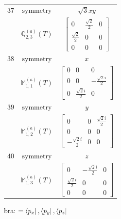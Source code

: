 \documentclass[fleqn,8pt,landscape]{jsarticle}
\begin{document}
\begin{longtable}{ccc}
$ 37 $ & $ \text{symmetry} $ & $ \sqrt{3} x y $ \\
$  $ & $ \mathbb{Q}_{2,3}^{(a)}(T) $ & $ \begin{bmatrix} 0 & \frac{\sqrt{2}}{2} & 0 \\ \frac{\sqrt{2}}{2} & 0 & 0 \\ 0 & 0 & 0 \end{bmatrix} $ \\ \hline
$ 38 $ & $ \text{symmetry} $ & $ x $ \\
$  $ & $ \mathbb{M}_{1,1}^{(a)}(T) $ & $ \begin{bmatrix} 0 & 0 & 0 \\ 0 & 0 & - \frac{\sqrt{2} i}{2} \\ 0 & \frac{\sqrt{2} i}{2} & 0 \end{bmatrix} $ \\ \hline
$ 39 $ & $ \text{symmetry} $ & $ y $ \\
$  $ & $ \mathbb{M}_{1,2}^{(a)}(T) $ & $ \begin{bmatrix} 0 & 0 & \frac{\sqrt{2} i}{2} \\ 0 & 0 & 0 \\ - \frac{\sqrt{2} i}{2} & 0 & 0 \end{bmatrix} $ \\ \hline
$ 40 $ & $ \text{symmetry} $ & $ z $ \\
$  $ & $ \mathbb{M}_{1,3}^{(a)}(T) $ & $ \begin{bmatrix} 0 & - \frac{\sqrt{2} i}{2} & 0 \\ \frac{\sqrt{2} i}{2} & 0 & 0 \\ 0 & 0 & 0 \end{bmatrix} $ \\ \hline
\end{longtable}
bra: $=\bra{p_{x}}, \bra{p_{y}}, \bra{p_{z}}$
\end{document}
